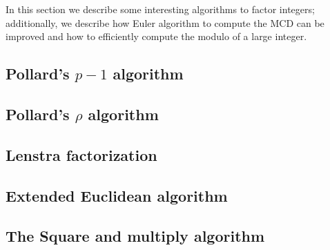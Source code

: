\documentclass{subfiles}
\begin{document}
    In this section we describe some interesting algorithms to factor integers;
        additionally, we describe how Euler algorithm to compute the MCD can be improved
        and how to efficiently compute the modulo of a large integer.

        \subsection{Pollard's \(p - 1\) algorithm}
        

        \subsection{Pollard's \(\rho\) algorithm}
        

        \subsection{Lenstra factorization}
        

        \subsection{Extended Euclidean algorithm}
        

        \subsection{The Square and multiply algorithm}
        
        \clearpage
\end{document}

